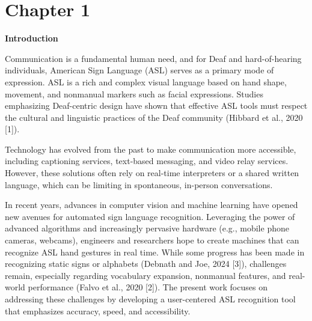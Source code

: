 \documentclass[12pt]{article}
\begin{document}
\clearpage
{}
\setcounter{page}{1}
\doublespacing

\newpage
\tableofcontents
\newpage

\listoffigures
\newpage

\doublespacing

\newpage
\section*{Chapter 1}
\begin{center}
\large \textbf{Introduction}
\end{center}

Communication is a fundamental human need, and for Deaf and hard-of-hearing individuals, 
American Sign Language (ASL) serves as a primary mode of expression. ASL is a rich and 
complex visual language based on hand shape, movement, and nonmanual markers such as facial 
expressions. Studies emphasizing Deaf-centric design have shown that effective ASL tools must 
respect the cultural and linguistic practices of the Deaf community (Hibbard et al., 2020 [1]).

Technology has evolved from the past to make communication more accessible, including captioning 
services, text-based messaging, and video relay services. However, these solutions often rely on 
real-time interpreters or a shared written language, which can be limiting in spontaneous, in-person 
conversations.

In recent years, advances in computer vision and machine learning have opened new 
avenues for automated sign language recognition. Leveraging the power of advanced algorithms 
and increasingly pervasive hardware (e.g., mobile phone cameras, webcams), engineers and 
researchers hope to create machines that can recognize ASL hand gestures in real time. While 
some progress has been made in recognizing static signs or alphabets (Debnath and Joe, 2024 [3]), 
challenges remain, especially regarding vocabulary expansion, nonmanual features, and real-world 
performance (Falvo et al., 2020 [2]). The present work focuses on addressing these challenges by 
developing a user-centered ASL recognition tool that emphasizes accuracy, speed, and accessibility.
\end{document}
